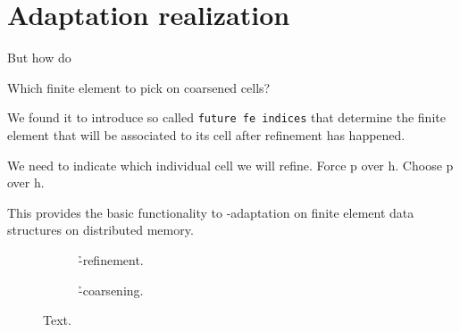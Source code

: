 \section{Adaptation realization}
\label{sec:adaptation}


But how do

Which finite element to pick on coarsened cells?

We found it to introduce so called \texttt{future fe indices} that determine the finite element that will be associated to its cell after refinement has happened.

We need to indicate which individual cell we will refine. Force p over h. Choose p over h.

This provides the basic functionality to \hp-adaptation on finite element data structures on distributed memory.


\begin{figure}
\begin{subfigure}{.5\textwidth}
  \caption{\h-refinement.}
\end{subfigure}
\begin{subfigure}{.5\textwidth}
  \caption{\h-coarsening.}
\end{subfigure}
\caption{Text.}
\label{fig:adaptation.}
\end{figure}